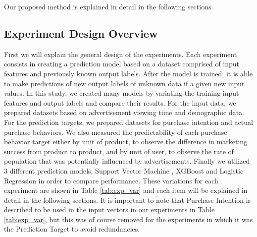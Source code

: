 \documentclass[review]{elsarticle}
\begin{document}
Our proposed method is explained in detail in the following sections.

\subsection{Experiment Design Overview}
\label{exp_design}

First we will explain the general design of the experiments. Each experiment consists in creating a prediction model based on a dataset comprised of input features and previously known output labels. After the model is trained, it is able to make predictions of new output labels of unknown data if a given new input values. In this study, we created many models by variating the training input features and output labels and compare their results. For the input data, we prepared datasets based on advertisement viewing time and demographic data. For the prediction targets, we prepared datasets for purchase intention and actual purchase behaviors. We also measured the predictability of each purchase behavior target either by unit of product, to observe the difference in marketing success from product to product, and by unit of user, to observe the rate of population that was potentially influenced by advertisements. Finally we utilized 3 different prediction models, Support Vector Machine \cite{svm}, XGBoost \cite{xgboost} and Logistic Regression \cite{logit} in order to compare performance. These variations for each experiment are shown in Table \ref{tab:exp_var} and each item will be explained in detail in the following sections. It is important to note that Purchase Intention is described to be used in the input vectors in our experiments in Table \ref{tab:exp_var}, but this was of course removed for the experiments in which it was the Prediction Target to avoid redundancies.
\end{document}
